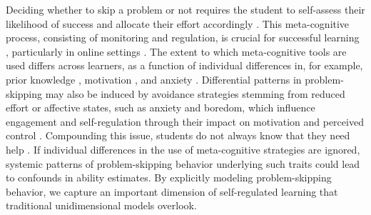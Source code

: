\documentclass[12pt]{article}
\begin{document}
Deciding whether to skip a problem or not requires the student to self-assess their likelihood of success and allocate their effort accordingly \parencite{winne2017cognition}. This meta-cognitive process, consisting of monitoring and regulation, is crucial for successful learning \parencite{rabinowitz2017nteraction, fleur2021metacognition, colantonio2024predicting}, particularly in online settings \parencite{zhao2020time, kim2009not, fidan2024emotions, shields2024active}. The extent to which meta-cognitive tools are used differs across learners, as a function of individual differences in, for example, prior knowledge \parencite{taub2014can}, motivation \parencite{sungur2007modeling, karlen2016differences}, and anxiety \parencite{matthews1999metacognition, wells1995metacognition}. Differential patterns in problem-skipping may also be induced by avoidance strategies stemming from reduced effort or affective states, such as anxiety and boredom, which influence engagement and self-regulation through their impact on motivation and perceived control \parencite{pekrun2013control}. Compounding this issue, students do not always know that they need help \parencite{aleven2000limitations}. If individual differences in the use of meta-cognitive strategies are ignored, systemic patterns of problem-skipping behavior underlying such traits could lead to confounds in ability estimates. By explicitly modeling problem-skipping behavior, we capture an important dimension of self-regulated learning that traditional unidimensional models overlook. 
\end{document}
